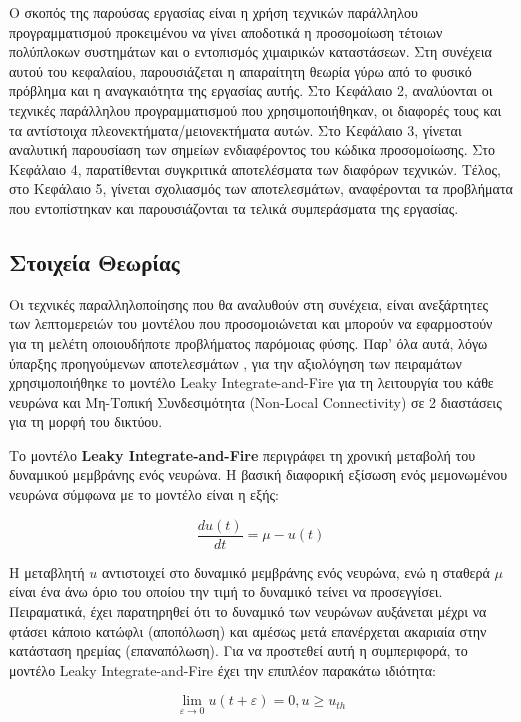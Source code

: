\documentclass[12pt,a4paper]{article}
\begin{document}
Ο σκοπός της παρούσας εργασίας είναι η χρήση τεχνικών παράλληλου προγραμματισμού προκειμένου να γίνει αποδοτικά η προσομοίωση τέτοιων πολύπλοκων συστημάτων και ο εντοπισμός χιμαιρικών καταστάσεων. Στη συνέχεια αυτού του κεφαλαίου, παρουσιάζεται η απαραίτητη θεωρία γύρω από το φυσικό πρόβλημα και η αναγκαιότητα της εργασίας αυτής. Στο Κεφάλαιο 2, αναλύονται οι τεχνικές παράλληλου προγραμματισμού που χρησιμοποιήθηκαν, οι διαφορές τους και τα αντίστοιχα πλεονεκτήματα/μειονεκτήματα αυτών. Στο Κεφάλαιο 3, γίνεται αναλυτική παρουσίαση των σημείων ενδιαφέροντος του κώδικα προσομοίωσης. Στο Κεφάλαιο 4, παρατίθενται συγκριτικά αποτελέσματα των διαφόρων τεχνικών. Τέλος, στο Κεφάλαιο 5, γίνεται σχολιασμός των αποτελεσμάτων, αναφέρονται τα προβλήματα που εντοπίστηκαν και παρουσιάζονται τα τελικά συμπεράσματα της εργασίας.

\subsection{Στοιχεία Θεωρίας}

Οι τεχνικές παραλληλοποίησης που θα αναλυθούν στη συνέχεια, είναι ανεξάρτητες των λεπτομερειών του μοντέλου που προσομοιώνεται και μπορούν να εφαρμοστούν για τη μελέτη οποιουδήποτε προβλήματος παρόμοιας φύσης. Παρ' όλα αυτά, λόγω ύπαρξης προηγούμενων αποτελεσμάτων \cite{schmidt_chimera_2017}, για την αξιολόγηση των πειραμάτων χρησιμοποιήθηκε το μοντέλο Leaky Integrate-and-Fire για τη λειτουργία του κάθε νευρώνα και Μη-Τοπική Συνδεσιμότητα (Non-Local Connectivity) σε 2 διαστάσεις για τη μορφή του δικτύου.

Το μοντέλο \textbf{Leaky Integrate-and-Fire} περιγράφει τη χρονική μεταβολή του δυναμικού μεμβράνης ενός νευρώνα. Η βασική διαφορική εξίσωση ενός μεμονωμένου νευρώνα σύμφωνα με το μοντέλο είναι η εξής:

\begin{equation}
\frac{du(t)}{dt} = \mu - u(t)
\end{equation}

Η μεταβλητή $u$ αντιστοιχεί στο δυναμικό μεμβράνης ενός νευρώνα, ενώ η σταθερά $\mu$ είναι ένα άνω όριο του οποίου την τιμή το δυναμικό τείνει να προσεγγίσει. Πειραματικά, έχει παρατηρηθεί ότι το δυναμικό των νευρώνων αυξάνεται μέχρι να φτάσει κάποιο κατώφλι (αποπόλωση) και αμέσως μετά επανέρχεται ακαριαία στην κατάσταση ηρεμίας (επαναπόλωση). Για να προστεθεί αυτή η συμπεριφορά, το μοντέλο Leaky Integrate-and-Fire έχει την επιπλέον παρακάτω ιδιότητα:

\begin{equation}
\lim_{\varepsilon \to 0} u(t+\varepsilon)=0 ,u \geq u_{th}
\end{equation}
\end{document}
